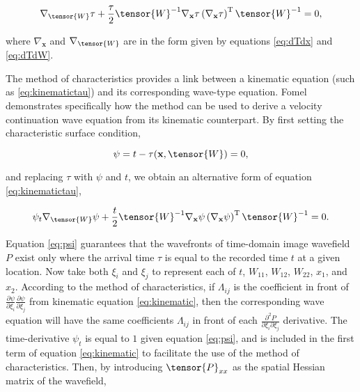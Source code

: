 \begin{equation}
\label{eq:kinematictau}
\nabla _{\tensor{W}}\tau +\frac{\tau }{2}\tensor{W}^{-1} \nabla _{\mathbf{x}}\tau \left( \nabla _{\mathbf{x}}\tau \right)^{\mathrm{T}}\tensor{W}^{-1}=0,
\end{equation}

\noindent where $\nabla _{\mathbf{x}}$ and $\nabla _{\tensor{W}}$ are in the form given by equations \ref{eq:dTdx} and \ref{eq:dTdW}.

The method of characteristics \cite[]{courant_hilbert89} provides a link between a kinematic equation (such as \ref{eq:kinematictau}) and its corresponding wave-type equation. 
Fomel \cite{GEO68-05-16501661} demonstrates specifically how the method can be used to derive a velocity continuation wave equation from its kinematic counterpart. 
By first setting the characteristic surface condition,

\begin{equation}
\label{eq:psi}
\psi =t-\tau (\mathbf{x},\tensor{W})=0,
\end{equation}

\noindent and replacing $\tau $ with $\psi $ and $t$, we obtain an alternative form of equation \ref{eq:kinematictau},

\begin{equation}
\label{eq:kinematic}
\psi _t\nabla _{\tensor{W}}\psi +\frac{t}{2}\tensor{W}^{-1} \nabla _{\mathbf{x}}\psi \left( \nabla _{\mathbf{x}}\psi \right)^{\mathrm{T}}\tensor{W}^{-1}=0.
\end{equation}

\noindent Equation \ref{eq:psi} guarantees that the wavefronts of time-domain image wavefield $P $ exist only where the arrival time $\tau $ is equal to the recorded time $t$ at a given location. 
Now take both $\xi _i$ and $\xi _j$ to represent each of $t$, $W_{11}$, $W_{12}$, $W_{22}$, $x_1$, and $x_2$. 
According to the method of characteristics, if $\Lambda _{ij}$ is the coefficient in front of $\frac{\partial \psi }{\partial \xi _i}\frac{\partial \psi }{\partial \xi _j}$ from kinematic equation \ref{eq:kinematic}, then the corresponding wave equation will have the same coefficients $\Lambda _{ij}$ in front of each $\frac{\partial ^2P }{\partial \xi _i\partial \xi _j}$ derivative.  
The time-derivative $\psi _t $ is equal to $1$ given equation \ref{eq:psi}, and is included in the first term of equation \ref{eq:kinematic} to facilitate the use of the method of characteristics.
Then, by introducing $\tensor{P}_{xx}$ as the spatial Hessian matrix of the wavefield, 

